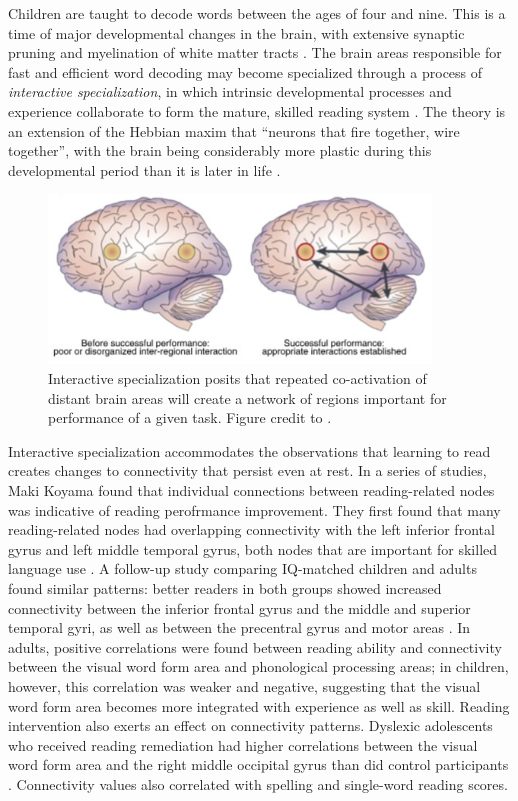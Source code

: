 Children are taught to decode words between the ages of four and nine. This is a time of major developmental changes in the brain, with extensive synaptic pruning and myelination of white matter tracts \citep{Wandell2013}. The brain areas responsible for fast and efficient word decoding may become specialized through a process of \textit{interactive specialization}, in which intrinsic developmental processes and experience collaborate to form the mature, skilled reading system \citep{Johnson2011, Klingberg2014}. The theory is an extension of the Hebbian maxim that ``neurons that fire together, wire together'', with the brain being considerably more plastic during this developmental period than it is later in life \citep{Hebb1949}.

\begin{figure}[h!]
    \centering
    \includegraphics[width=4in]{images/ch1-interactive-specialization.jpg}
        \caption[Interactive specialization explains changes in activity.]{Interactive specialization posits that repeated co-activation of distant brain areas will create a network of regions important for performance of a given task. Figure credit to \citep{Gaffrey2013}.}
    \label{fig:ch1-interactive-specialization}
\end{figure}

Interactive specialization accommodates the observations that learning to read creates changes to connectivity that persist even at rest. In a series of studies, Maki Koyama found that individual connections between reading-related nodes was indicative of reading perofrmance improvement. They first found that many reading-related nodes had overlapping connectivity with the left inferior frontal gyrus and left middle temporal gyrus, both nodes that are important for skilled language use \citep{Koyama2010}. A follow-up study comparing IQ-matched children and adults found similar patterns: better readers in both groups showed increased connectivity between the inferior frontal gyrus and the middle and superior temporal gyri, as well as between the precentral gyrus and motor areas \citep{Koyama2011}. In adults, positive correlations were found between reading ability and connectivity between the visual word form area and phonological processing areas; in children, however, this correlation was weaker and negative, suggesting that the visual word form area becomes more integrated with experience as well as skill. Reading intervention also exerts an effect on connectivity patterns. Dyslexic adolescents who received reading remediation had higher correlations between the visual word form area and the right middle occipital gyrus than did control participants \citep{Koyama2013}. Connectivity values also correlated with spelling and single-word reading scores.

